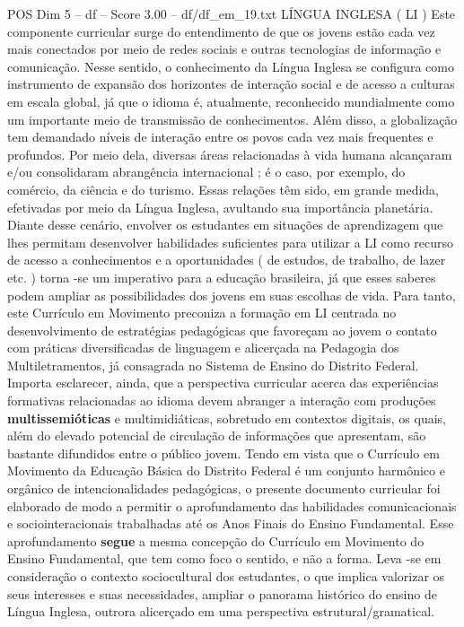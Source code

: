 \begin{textsample}{POS Dim 5 – df – Score 3.00 – df/df\_em\_19.txt}  \label{ex:f5_pos_160}
LÍNGUA INGLESA ( LI ) Este componente curricular surge do entendimento de que os jovens estão cada vez mais conectados por meio de redes sociais e outras tecnologias de informação e comunicação.
Nesse sentido, o conhecimento da Língua Inglesa se configura como instrumento de expansão dos horizontes de interação social e de acesso a culturas em escala global, já que o idioma é, atualmente, reconhecido mundialmente como um importante meio de transmissão de conhecimentos.
Além disso, a globalização tem demandado níveis de interação entre os povos cada vez mais frequentes e profundos.
Por meio dela, diversas áreas relacionadas à vida humana alcançaram e/ou consolidaram abrangência internacional ; é o caso, por exemplo, do comércio, da ciência e do turismo.
Essas relações têm sido, em grande medida, efetivadas por meio da Língua Inglesa, avultando sua importância planetária.
Diante desse cenário, envolver os estudantes em situações de aprendizagem que lhes permitam desenvolver habilidades suficientes para utilizar a LI como recurso de acesso a conhecimentos e a oportunidades ( de estudos, de trabalho, de lazer etc. ) torna -se um imperativo para a educação brasileira, já que esses saberes podem ampliar as possibilidades dos jovens em suas escolhas de vida.
Para tanto, este Currículo em Movimento preconiza a formação em LI centrada no desenvolvimento de estratégias pedagógicas que favoreçam ao jovem o contato com práticas diversificadas de linguagem e alicerçada na Pedagogia dos Multiletramentos, já consagrada no Sistema de Ensino do Distrito Federal.
Importa esclarecer, ainda, que a perspectiva curricular acerca das experiências formativas relacionadas ao idioma devem abranger a interação com produções \textbf{multissemióticas} e multimidiáticas, sobretudo em contextos digitais, os quais, além do elevado potencial de circulação de informações que apresentam, são bastante difundidos entre o público jovem.
Tendo em vista que o Currículo em Movimento da Educação Básica do Distrito Federal é um conjunto harmônico e orgânico de intencionalidades pedagógicas, o presente documento curricular foi elaborado de modo a permitir o aprofundamento das habilidades comunicacionais e sociointeracionais trabalhadas até os Anos Finais do Ensino Fundamental.
Esse aprofundamento \textbf{segue} a mesma concepção do Currículo em Movimento do Ensino Fundamental, que tem como foco o sentido, e não a forma.
Leva -se em consideração o contexto sociocultural dos estudantes, o que implica valorizar os seus interesses e suas necessidades, ampliar o panorama histórico do ensino de Língua Inglesa, outrora alicerçado em uma perspectiva estrutural/gramatical.

\end{textsample}
